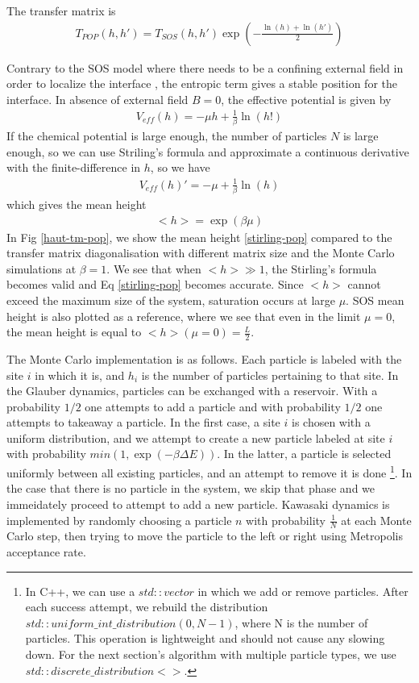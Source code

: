 The transfer matrix is
\begin{align}
T_{POP}(h,h') = T_{SOS}(h,h') \exp \left(- \frac{\ln(h)+\ln(h')}{2} \right)
\end{align}

Contrary to the SOS model where there needs to be a confining external field in order to localize the interface \cite{burkhardt_localisation-delocalisation_1981,chui_pinning_1981}, the entropic term gives a stable position for the interface. In absence of external field $B=0$, the effective potential is given by
\begin{align} 
    V_{eff}(h) = - \mu h + \frac{1}{\beta}\ln(h!)
\end{align}
If the chemical potential is large enough, the number of particles $N$ is large enough, so we can use Striling's formula and approximate a continuous derivative with the finite-difference in $h$, so we have
\begin{align} 
    V_{eff}(h)' = - \mu +\frac{1}{\beta} \ln(h)
\end{align}which gives the mean height 
\begin{align} 
    <h> = \exp(\beta \mu) 
\label{stirling-pop}
    \end{align}
    In Fig \ref{haut-tm-pop}, we show the mean height \eqref{stirling-pop} compared to the transfer matrix diagonalisation with different matrix size and the Monte Carlo simulations at $\beta=1$. We see that when $ <h> \gg 1$, the Stirling's formula becomes valid and Eq \eqref{stirling-pop} becomes accurate. Since $<h>$ cannot exceed the maximum size of the system, saturation occurs at large $\mu$. SOS mean height is also plotted as a reference, where we see that even in the limit $\mu=0$, the mean height is equal to $<h>(\mu=0) = \frac{L}{2}$.


The Monte Carlo implementation is as follows. Each particle is labeled with the site $i$ in which it is, and $h_i$ is the number of particles pertaining to that site. 
In the Glauber dynamics, particles can be exchanged with a reservoir. With a probability $1/2$ one attempts to add a particle and with probability $1/2$ one attempts to takeaway a particle. In the first case, a site $i$ is chosen with a uniform distribution, and we attempt to create a new particle labeled at site $i$ with probability $min(1,\exp(-\beta \Delta E))$. In the latter, a particle is selected uniformly between all existing particles, and an attempt to remove it is done
\footnote{In C++, we can use a $std::vector$ in which we add or remove particles. After each success attempt, we rebuild the distribution $std::uniform\_int\_distribution(0,N-1)$, where N is the number of particles. This operation is lightweight and should not cause any slowing down. For the next section's algorithm with multiple particle types, we use $std::discrete\_distribution<>$. }. In the case that there is no particle in the system, we skip that phase and we immeidately proceed to attempt to add a new particle.
Kawasaki dynamics is implemented by randomly choosing a particle $n$ with probability $\frac{1}{N}$ at each Monte Carlo step, then trying to move the particle to the left or right using Metropolis acceptance rate. 

